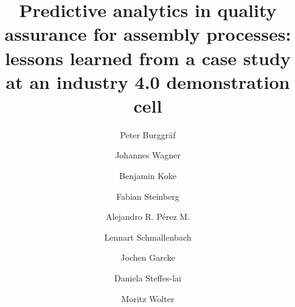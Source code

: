 \documentclass[5p,times,procedia]{elsarticle}
\begin{document}
\begin{frontmatter}



%

\title{Predictive analytics in quality assurance for assembly processes:
       lessons learned from a case study at an industry 4.0 demonstration cell}




\author[a]{Peter Burggräf}
\author[a]{Johannes Wagner}
\author[a]{Benjamin Koke}
\author[a]{Fabian Steinberg} 
\author[a]{Alejandro R. Pérez M.}
\author[a]{Lennart Schmallenbach}
\author[b,c]{Jochen Garcke}
\author[b]{Daniela Steffes-lai}
\author[b,d]{Moritz Wolter}


\address[a]{Chair of International Production Engineering and Management (IPEM), Universität Siegen, Paul-Bonatz-Straße 9-11, Siegen - 57076, Germany}
\address[b]{Fraunhofer Institute for Algorithms and Scientific Computing (SCAI), Schloss Birlinghoven 1, Sankt Augustin- 53757, Germany}
\address[c]{Institut for Numerical Simulation, Universität Bonn, Endenicher Allee 19b, 53115 Bonn}
\address[d]{Institut for Computer Science, Universität Bonn, Endenicher Allee 19a, 53115 Bonn}



\end{frontmatter}
\end{document}
